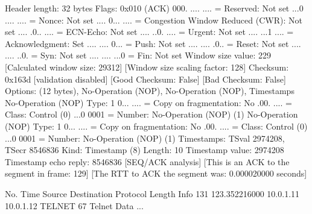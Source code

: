     Header length: 32 bytes
    Flags: 0x010 (ACK)
        000. .... .... = Reserved: Not set
        ...0 .... .... = Nonce: Not set
        .... 0... .... = Congestion Window Reduced (CWR): Not set
        .... .0.. .... = ECN-Echo: Not set
        .... ..0. .... = Urgent: Not set
        .... ...1 .... = Acknowledgment: Set
        .... .... 0... = Push: Not set
        .... .... .0.. = Reset: Not set
        .... .... ..0. = Syn: Not set
        .... .... ...0 = Fin: Not set
    Window size value: 229
    [Calculated window size: 29312]
    [Window size scaling factor: 128]
    Checksum: 0x163d [validation disabled]
        [Good Checksum: False]
        [Bad Checksum: False]
    Options: (12 bytes), No-Operation (NOP), No-Operation (NOP), Timestamps
        No-Operation (NOP)
            Type: 1
                0... .... = Copy on fragmentation: No
                .00. .... = Class: Control (0)
                ...0 0001 = Number: No-Operation (NOP) (1)
        No-Operation (NOP)
            Type: 1
                0... .... = Copy on fragmentation: No
                .00. .... = Class: Control (0)
                ...0 0001 = Number: No-Operation (NOP) (1)
        Timestamps: TSval 2974208, TSecr 8546836
            Kind: Timestamp (8)
            Length: 10
            Timestamp value: 2974208
            Timestamp echo reply: 8546836
    [SEQ/ACK analysis]
        [This is an ACK to the segment in frame: 129]
        [The RTT to ACK the segment was: 0.000020000 seconds]

No.     Time           Source                Destination           Protocol Length Info
    131 123.352216000  10.0.1.11             10.0.1.12             TELNET   67     Telnet Data ...


